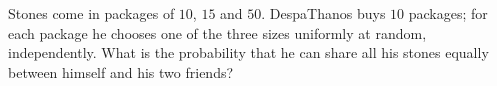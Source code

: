 Stones come in packages of $10$, $15$ and $50$. DespaThanos buys $10$ packages; for each package he chooses one of the three sizes uniformly at random, independently. What is the probability that he can share all his stones equally between himself and his two friends?
